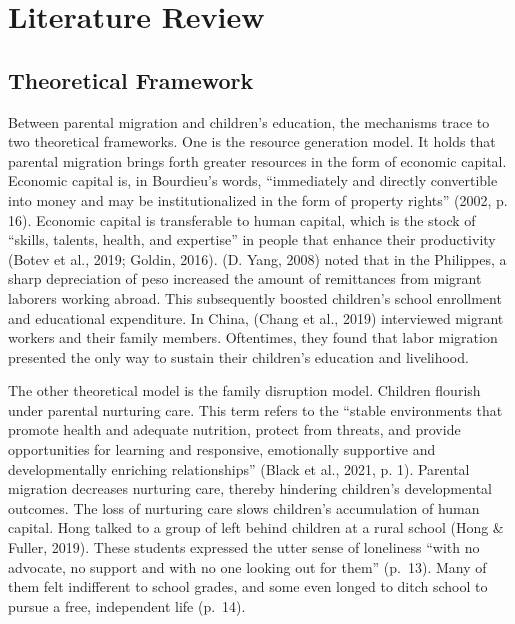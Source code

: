 \documentclass[
  man,floatsintext]{apa7}
\begin{document}
\newpage

\hypertarget{literature-review}{%
\section{Literature Review}\label{literature-review}}

\hypertarget{theoretical-framework}{%
\subsection{Theoretical Framework}\label{theoretical-framework}}

Between parental migration and children's education, the mechanisms trace to two theoretical frameworks. One is the resource generation model. It holds that parental migration brings forth greater resources in the form of economic capital. Economic capital is, in Bourdieu's words, ``immediately and directly convertible into money and may be institutionalized in the form of property rights'' (2002, p. 16). Economic capital is transferable to human capital, which is the stock of ``skills, talents, health, and expertise'' in people that enhance their productivity (Botev et al., 2019; Goldin, 2016). (D. Yang, 2008) noted that in the Philippes, a sharp depreciation of peso increased the amount of remittances from migrant laborers working abroad. This subsequently boosted children's school enrollment and educational expenditure. In China, (Chang et al., 2019) interviewed migrant workers and their family members. Oftentimes, they found that labor migration presented the only way to sustain their children's education and livelihood.

The other theoretical model is the family disruption model. Children flourish under parental nurturing care. This term refers to the ``stable environments that promote health and adequate nutrition, protect from threats, and provide opportunities for learning and responsive, emotionally supportive and developmentally enriching relationships'' (Black et al., 2021, p. 1). Parental migration decreases nurturing care, thereby hindering children's developmental outcomes. The loss of nurturing care slows children's accumulation of human capital. Hong talked to a group of left behind children at a rural school (Hong \& Fuller, 2019). These students expressed the utter sense of loneliness ``with no advocate, no support and with no one looking out for them'' (p.~13). Many of them felt indifferent to school grades, and some even longed to ditch school to pursue a free, independent life (p.~14).
\end{document}
